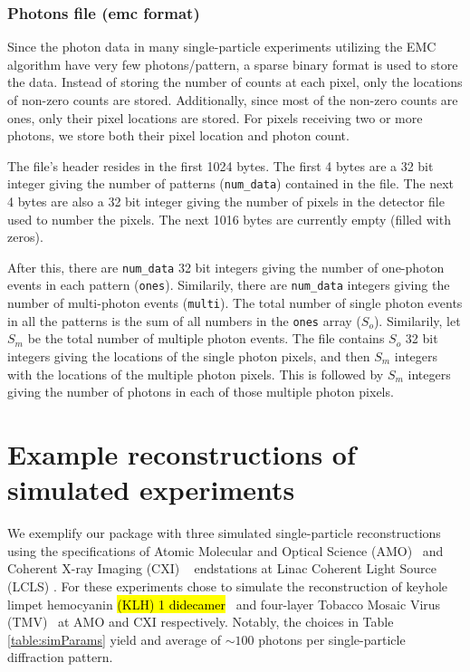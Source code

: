 \documentclass[preprint]{iucr}              %
\begin{document}
\subsubsection{Photons file (emc format)}\label{subsubsec:emcformat}
Since the photon data in many single-particle experiments utilizing the EMC algorithm have very few photons/pattern, a sparse binary format is used to store the data. Instead of storing the number of counts at each pixel, only the locations of non-zero counts are stored. Additionally, since most of the non-zero counts are ones, only their pixel locations are stored. For pixels receiving two or more photons, we store both their pixel location and photon count. 

The file's header resides in the first 1024 bytes. The first 4 bytes are a 32 bit integer giving the number of patterns (\texttt{num\_data}) contained in the file. The next 4 bytes are also a 32 bit integer giving the number of pixels in the detector file used to number the pixels. The next 1016 bytes are currently empty (filled with zeros).

After this, there are \texttt{num\_data} 32 bit integers giving the number of one-photon events in each pattern (\texttt{ones}). Similarily, there are \texttt{num\_data} integers giving the number of multi-photon events (\texttt{multi}). The total number of single photon events in all the patterns is the sum of all numbers in the \texttt{ones} array ($S_o$). Similarily, let $S_m$ be the total number of multiple photon events. The file contains $S_o$ 32 bit integers giving the locations of the single photon pixels, and then $S_m$ integers with the locations of the multiple photon pixels. This is followed by $S_m$ integers giving the number of photons in each of those multiple photon pixels. 

\section{Example reconstructions of simulated experiments}\label{sec:simulations}

We exemplify our package with three simulated single-particle reconstructions using the specifications of Atomic Molecular and Optical Science (AMO)~\cite{ferguson2015} and Coherent X-ray Imaging (CXI) ~\cite{liang2015} endstations at Linac Coherent Light Source (LCLS) \cite{Emma2010}. For these experiments chose to simulate the reconstruction of keyhole limpet hemocyanin \hl{(KLH) 1 didecamer}~\cite{gatsogiannis2009} and four-layer Tobacco Mosaic Virus (TMV)~\cite{bhyravbhatla1998} at AMO and CXI respectively. Notably, the choices in Table \ref{table:simParams} yield and average of $\sim 100$ photons per single-particle diffraction pattern.
\end{document}
